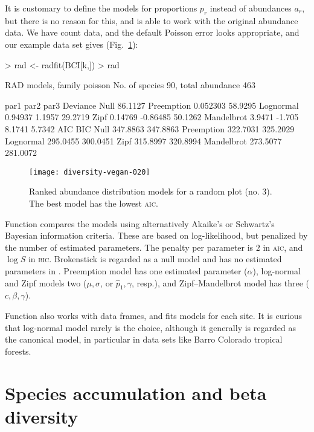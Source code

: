 \documentclass[a4paper,10pt,twocolumn]{article}
\begin{document}
It is customary to define the models for proportions $p_r$ instead of
abundances $a_r$, but there is no reason for this, and 
is able to work with the original abundance data.  We have count data,
and the default Poisson error looks appropriate, and our example data
set gives (Fig.~\ref{fig:rad}):
\begin{Schunk}
\begin{Sinput}
> rad <- radfit(BCI[k,])
> rad
\end{Sinput}
\begin{Soutput}
RAD models, family poisson 
No. of species 90, total abundance 463

           par1      par2     par3    Deviance
Null                                   86.1127
Preemption  0.052303                   58.9295
Lognormal   0.94937   1.1957           29.2719
Zipf        0.14769  -0.86485          50.1262
Mandelbrot  3.9471   -1.705    8.1741   5.7342
           AIC      BIC     
Null       347.8863 347.8863
Preemption 322.7031 325.2029
Lognormal  295.0455 300.0451
Zipf       315.8997 320.8994
Mandelbrot 273.5077 281.0072
\end{Soutput}
\end{Schunk}
\begin{figure}
\texttt{[image: diversity-vegan-020]}
\caption{Ranked abundance distribution models for a random plot
  (no. 3).  The best model has the lowest \textsc{aic}.}
\label{fig:rad}
\end{figure}

Function  compares the models using alternatively
Akaike's or Schwartz's Bayesian information criteria.  These are based
on log-likelihood, but penalized by the number of estimated
parameters.  The penalty per parameter is $2$ in \textsc{aic}, and
$\log S$ in \textsc{bic}.  Brokenstick is regarded as a null model and
has no estimated parameters in .  Preemption model has
one estimated parameter ($\alpha$), log-normal and Zipf models two
($\mu, \sigma$, or $\hat p_1, \gamma$, resp.), and Zipf--Mandelbrot
model has three ($c, \beta, \gamma$).

Function  also works with data frames, and fits models
for each site. It is curious that log-normal model rarely is the
choice, although it generally is regarded as the canonical model, in
particular in data sets like Barro Colorado tropical forests.

\section{Species accumulation and beta diversity}
\end{document}

